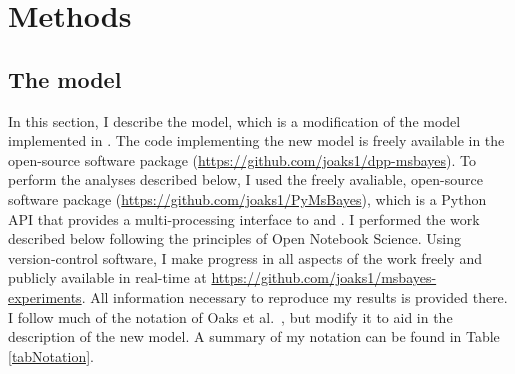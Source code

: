 \section{Methods}

\subsection{The model}
In this section, I describe the model, which is a modification of the model
implemented in \msb \cite{Huang2011,Oaks2012}.
The code implementing the new model is freely available in the open-source
software package \dppmsbayes
(\href{https://github.com/joaks1/dpp-msbayes}{\url{https://github.com/joaks1/dpp-msbayes}}).
To perform the analyses described below, I used the freely avaliable,
open-source software package \pymsbayes
(\href{https://github.com/joaks1/PyMsBayes}{\url{https://github.com/joaks1/PyMsBayes}}),
which is a Python API that provides a multi-processing interface to \msb and
\dppmsbayes.
I performed the work described below following the principles of
Open Notebook Science.
Using version-control software, I make progress in all aspects of the work
freely and publicly available in real-time at
\href{https://github.com/joaks1/msbayes-experiments}{\url{https://github.com/joaks1/msbayes-experiments}}.
All information necessary to reproduce my results is provided there.
I follow much of the notation of Oaks et al.\ \cite{Oaks2012}, but modify it to
aid in the description of the new model.
A summary of my notation can be found in Table \ref{tabNotation}.

